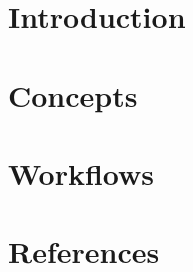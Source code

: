 \section[Intro]{Introduction}


\section[Concepts]{Concepts}


\section[Workflows]{Workflows}


 \section[Refs]{References}


